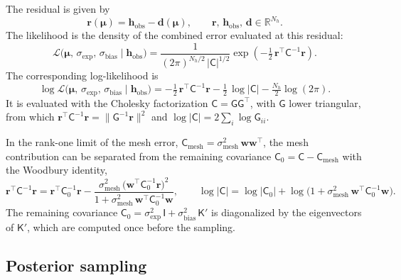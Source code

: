 \documentclass{elsarticle}
\renewcommand{\vec}[1]{\boldsymbol{#1}}
\newcommand{\mat}[1]{\mathsf{#1}}
\newcommand{\params}{\boldsymbol{\mu}}
\newcommand{\subexp}{\mathrm{exp}}
\newcommand{\subbias}{\mathrm{bias}}
\newcommand{\submesh}{\mathrm{mesh}}        %
\newcommand{\obs}{\mathrm{obs}}
\begin{document}
The residual is given by
\begin{equation}
\vec{r}(\params)
= \vec{h}_{\obs} - \vec{d}(\params),
\qquad
\vec{r},\,\vec{h}_{\obs},\,\vec{d}\in \mathbb{R}^{N_h}.
\label{eq:residual}
\end{equation}
The likelihood is the density of the combined error evaluated at this residual:
\begin{equation}
\mathcal{L}\bigl({\params},\,\sigma_{\subexp},\,\sigma_{\subbias}
\mid \vec{h}_{\obs}\bigr)
= \dfrac{1}{(2\pi)^{N_h/2}\,|\mat{C}|^{1/2}}
  \exp\!\left(-\tfrac{1}{2}\,\vec{r}^{\top}\mat{C}^{-1}\vec{r}\right).
\label{eq:likelihood}
\end{equation}
The corresponding log-likelihood is
\begin{equation}
\log \mathcal{L}\bigl({\params},\,\sigma_{\subexp},\,\sigma_{\subbias}
\mid \vec{h}_{\obs}\bigr)
= -\tfrac{1}{2}\,\vec{r}^{\top}\mat{C}^{-1}\vec{r}
  -\tfrac{1}{2}\,\log|\mat{C}|
  -\tfrac{N_h}{2}\log(2\pi).
\label{eq:loglikelihood}
\end{equation}
It is evaluated with the Cholesky factorization
$\mat{C}=\mat{G}\mat{G}^{\top}$, with $\mat{G}$ lower triangular, from which
$\vec{r}^{\top}\mat{C}^{-1}\vec{r} = \|\mat{G}^{-1}\vec{r}\|^{2}$ and
$\log|\mat{C}| = 2\sum_{i}\log \mat{G}_{ii}$.

In the rank-one limit of the mesh error,
$\mat{C}_{\submesh} = \sigma_{\submesh}^{2}\,\vec{w}\vec{w}^{\top}$, the mesh
contribution can be separated from the remaining covariance
$\mat{C}_{0} = \mat{C} - \mat{C}_{\submesh}$ with the Woodbury identity,
\begin{equation}
\vec{r}^{\top}\mat{C}^{-1}\vec{r}
= \vec{r}^{\top}\mat{C}_{0}^{-1}\vec{r}
- \frac{\sigma_{\submesh}^{2}\,
        \bigl(\vec{w}^{\top}\mat{C}_{0}^{-1}\vec{r}\bigr)^{2}}
       {1+\sigma_{\submesh}^{2}\,\vec{w}^{\top}\mat{C}_{0}^{-1}\vec{w}},
\qquad
\log|\mat{C}|
= \log|\mat{C}_{0}|
+ \log\bigl(1+\sigma_{\submesh}^{2}\,
            \vec{w}^{\top}\mat{C}_{0}^{-1}\vec{w}\bigr).
\label{eq:woodbury}
\end{equation}
The remaining covariance
$\mat{C}_{0} = \sigma_{\subexp}^{2}\,\mat{I} + \sigma_{\subbias}^{2}\,\mat{K}'$
is diagonalized by the eigenvectors of $\mat{K}'$, which are computed once
before the sampling.

\subsection{Posterior sampling}
\label{subsec:posterior}
\end{document}
